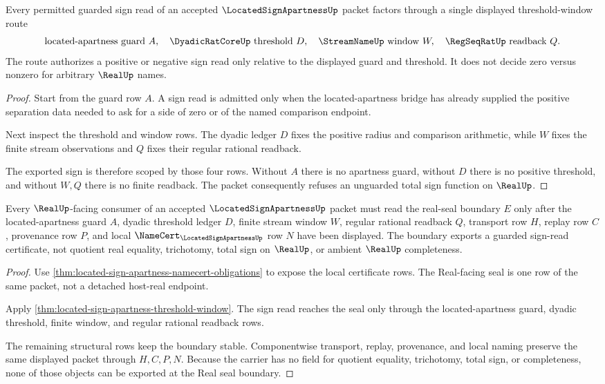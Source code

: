 \begin{theorem}
\label{thm:located-sign-apartness-threshold-window}
Every permitted guarded sign read of an accepted $\LocatedSignApartnessUp$ packet factors through a single displayed threshold-window route
$$
\text{located-apartness guard } A,\quad
\DyadicRatCoreUp \text{ threshold } D,\quad
\StreamNameUp \text{ window } W,\quad
\RegSeqRatUp \text{ readback } Q .
$$
The route authorizes a positive or negative sign read only relative to the displayed guard and threshold. It does not decide zero versus nonzero for arbitrary $\RealUp$ names.
\end{theorem}
\begin{proof}
Start from the guard row $A$. A sign read is admitted only when the located-apartness bridge has already supplied the positive separation data needed to ask for a side of zero or of the named comparison endpoint.

Next inspect the threshold and window rows. The dyadic ledger $D$ fixes the positive radius and comparison arithmetic, while $W$ fixes the finite stream observations and $Q$ fixes their regular rational readback.

The exported sign is therefore scoped by those four rows. Without $A$ there is no apartness guard, without $D$ there is no positive threshold, and without $W,Q$ there is no finite readback. The packet consequently refuses an unguarded total sign function on $\RealUp$.
\end{proof}

\begin{theorem}
\label{thm:located-sign-apartness-real-seal-boundary}
Every $\RealUp$-facing consumer of an accepted $\LocatedSignApartnessUp$ packet must read the real-seal boundary $E$ only after the located-apartness guard $A$, dyadic threshold ledger $D$, finite stream window $W$, regular rational readback $Q$, transport row $H$, replay row $C$, provenance row $P$, and local $\NameCert_{\LocatedSignApartnessUp}$ row $N$ have been displayed. The boundary exports a guarded sign-read certificate, not quotient real equality, trichotomy, total sign on $\RealUp$, or ambient $\RealUp$ completeness.
\end{theorem}
\begin{proof}
Use \autoref{thm:located-sign-apartness-namecert-obligations} to expose the local certificate rows. The Real-facing seal is one row of the same packet, not a detached host-real endpoint.

Apply \autoref{thm:located-sign-apartness-threshold-window}. The sign read reaches the seal only through the located-apartness guard, dyadic threshold, finite window, and regular rational readback rows.

The remaining structural rows keep the boundary stable. Componentwise transport, replay, provenance, and local naming preserve the same displayed packet through $H,C,P,N$. Because the carrier has no field for quotient equality, trichotomy, total sign, or completeness, none of those objects can be exported at the Real seal boundary.
\end{proof}

